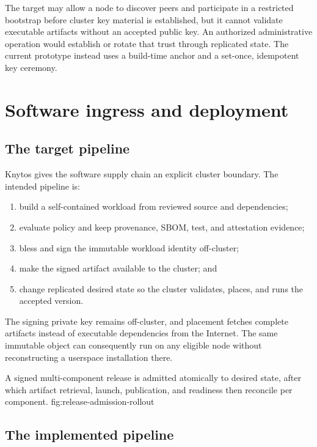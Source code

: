 The target may allow a node to discover peers and participate in a restricted
bootstrap before cluster key material is established, but it cannot validate
executable artifacts without an accepted public key. An authorized
administrative operation would establish or rotate that trust through
replicated state. The current prototype instead uses a build-time anchor and
a set-once, idempotent key ceremony.

\section{Software ingress and deployment}

\subsection{The target pipeline}

Knytos gives the software supply chain an explicit cluster boundary. The
intended pipeline is:

\begin{enumerate}
    \item build a self-contained workload from reviewed source and
        dependencies;
    \item evaluate policy and keep provenance, SBOM, test, and attestation
        evidence;
    \item bless and sign the immutable workload identity off-cluster;
    \item make the signed artifact available to the cluster; and
    \item change replicated desired state so the cluster validates, places,
        and runs the accepted version.
\end{enumerate}

The signing private key remains off-cluster, and placement fetches complete
artifacts instead of executable dependencies from the Internet. The same
immutable object can consequently run on any eligible node without
reconstructing a userspace installation there.

    {A signed multi-component release is admitted atomically to desired state, after which
    artifact retrieval, launch, publication, and readiness then reconcile per
    component.}
    {fig:release-admission-rollout}

\subsection{The implemented pipeline}

